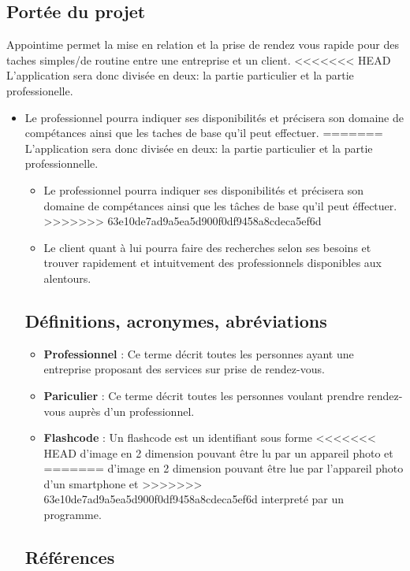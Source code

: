 \documentclass{article}
\begin{document}
\subsection{Portée du projet}
Appointime permet la mise en relation et la prise de rendez vous rapide pour des taches simples/de routine entre une entreprise et un client.
<<<<<<< HEAD
L’application sera donc divisée en deux: la partie particulier et la partie professionelle.
\begin{itemize}
\item Le professionnel pourra indiquer ses disponibilités et précisera son domaine de compétances ainsi que les taches de base qu’il peut effectuer.
=======
L’application sera donc divisée en deux: la partie particulier et la partie professionnelle.
\begin{itemize}
\item Le professionnel pourra indiquer ses disponibilités et précisera son domaine de compétances ainsi que les tâches de base qu’il peut éffectuer.
>>>>>>> 63e10de7ad9a5ea5d900f0df9458a8cdeca5ef6d
\item Le client quant à lui pourra faire des recherches selon ses
  besoins et trouver rapidement et intuitvement des professionnels
  disponibles aux alentours.
\end{itemize}
\subsection{Définitions, acronymes, abréviations}
\begin{itemize}
\item \textbf{Professionnel} : Ce terme décrit toutes les personnes ayant une entreprise proposant des
  services sur prise de rendez-vous.
\item \textbf{Pariculier} : Ce terme décrit toutes les personnes
  voulant prendre rendez-vous auprès d'un professionnel.
\item \textbf{Flashcode} : Un flashcode est un identifiant sous forme
<<<<<<< HEAD
  d'image en 2 dimension pouvant être lu par un appareil photo et
=======
  d'image en 2 dimension pouvant être lue par l'appareil photo d'un smartphone et
>>>>>>> 63e10de7ad9a5ea5d900f0df9458a8cdeca5ef6d
  interpreté par un programme.

\end{itemize}


\subsection{Références}


\end{itemize}
\end{document}
